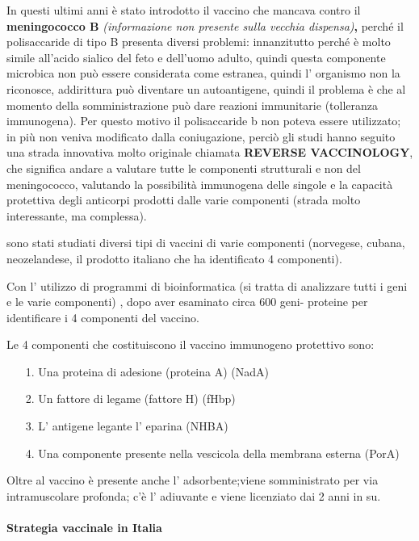   In questi ultimi anni è stato introdotto il vaccino che mancava contro
  il \textbf{meningococco B} \emph{(informazione non presente sulla
  vecchia dispensa)}\textbf{,} perché il polisaccaride di tipo B
  presenta diversi problemi: innanzitutto perché è molto simile
  all'acido sialico del feto e dell'uomo adulto, quindi questa
  componente microbica non può essere considerata come estranea, quindi
  l' organismo non la riconosce, addirittura può diventare un
  autoantigene, quindi il problema è che al momento della
  somministrazione può dare reazioni immunitarie (tolleranza
  immunogena). Per questo motivo il polisaccaride b non poteva essere
  utilizzato; in più non veniva modificato dalla coniugazione, perciò
  gli studi hanno seguito una strada innovativa molto originale chiamata
  \textbf{REVERSE VACCINOLOGY}, che significa andare a valutare tutte le
  componenti strutturali e non del meningococco, valutando la
  possibilità immunogena delle singole e la capacità protettiva degli
  anticorpi prodotti dalle varie componenti (strada molto interessante,
  ma complessa).

  sono stati studiati diversi tipi di vaccini di varie componenti
  (norvegese, cubana, neozelandese, il prodotto italiano che ha
  identificato 4 componenti).

  Con l' utilizzo di programmi di bioinformatica (si tratta di
  analizzare tutti i geni e le varie componenti) , dopo aver esaminato
  circa 600 geni- proteine per identificare i 4 componenti del vaccino.

  Le 4 componenti che costituiscono il vaccino immunogeno protettivo
  sono:
\begin{itemize}

\item[1.]
  Una proteina di adesione (proteina A) (NadA)
\item[2.]
  Un fattore di legame (fattore H) (fHbp)
\item[3.]
  L' antigene legante l' eparina (NHBA)
\item[4.]
  Una componente presente nella vescicola della membrana esterna (PorA)
\end{itemize}
  Oltre al vaccino è presente anche l' adsorbente;viene somministrato
  per via intramuscolare profonda; c'è l' adiuvante e viene licenziato
  dai 2 anni in su.

\paragraph{Strategia vaccinale in Italia}

